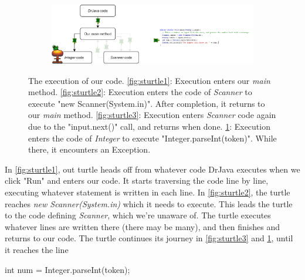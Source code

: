 \begin{figure}[h!]
\begin{subfigure}{1.\textwidth}
  \centering
  \includegraphics[width=1\textwidth]{lectures/images/code_turtle_4.png}
  \caption{}
  \label{fig:sturtle4}
\end{subfigure}%

\caption{The execution of our code. \ref{fig:sturtle1}: Execution enters our \textit{main} method. \ref{fig:sturtle2}: Execution enters the code of \textit{Scanner} to execute "new Scanner(System.in)". After completion, it returns to our \textit{main} method. \ref{fig:sturtle3}: Execution enters \textit{Scanner} code again due to the "input.next()" call, and returns when done. \ref{fig:sturtle4}: Execution enters the code of \textit{Integer} to execute "Integer.parseInt(token)". While there, it encounters an Exception.}
\label{fig:turtles}
\end{figure}



In \ref{fig:sturtle1}, out turtle heads off from whatever code DrJava executes when we click "Run" and enters our code. It starts traversing the code line by line, executing whatever statement is written in each line. In \ref{fig:sturtle2}, the turtle reaches \emph{new Scanner(System.in)} which it needs to execute. This leads the turtle to the code defining \emph{Scanner}, which we're unaware of. The turtle executes whatever lines are written there (there may be many), and then finishes and returns to our code. The turtle continues its journey in \ref{fig:sturtle3} and \ref{fig:sturtle4}, until it reaches the line 

\begin{code}
int num = Integer.parseInt(token);
\end{code}



